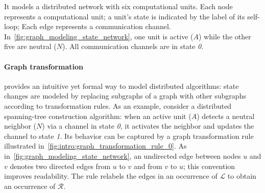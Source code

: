 It models a distributed network with six computational units.
Each node represents a computational unit; a unit's state is indicated by the label of its self-loop; Each edge represents a communication channel. In~\autoref{fig:graph_modeling_state_network}, one unit is active ($A$) while the other five are neutral ($N$). All communication channels are in state \textit{0}.

\paragraph{Graph transformation} provides an intuitive yet formal way to model distributed algorithms: state changes are modeled by replacing subgraphs of a graph with other subgraphs according to transformation rules.
As an example, consider a distributed spanning-tree construction algorithm: when an active unit ($A$) detects a neutral neighbor ($N$) via a channel in state \textit{0}, it activates the neighbor and updates the channel to state \textit{1}.
 Its behavior can be captured by a graph transformation rule illustrated in~\autoref{fig:intro:graph_transformation_rule_0}. As in~\autoref{fig:graph_modeling_state_network}, an undirected edge between nodes $u$ and $v$ denotes two directed edges from $u$ to $v$ and from $v$ to $u$; this convention improves readability.
 The rule relabels the edges in an occurrence of $\mathcal{L}$ to obtain an occurrence of $\mathcal{R}$.
 \begin{figure}[!ht]
        \centering
        \caption{} 
        \label{fig:intro:graph_transformation_rule_0}
    \end{figure}

